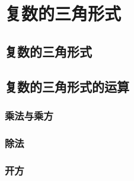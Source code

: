 \section{复数的三角形式}
\subsection{复数的三角形式}
\begin{Practice}
  \begin{question}
    \item 
    \item 
    \item 
  \end{question}
\end{Practice}

\subsection{复数的三角形式的运算}
\subsubsection{乘法与乘方}
\begin{Practice}
  \begin{question}
    \item 
    \item 
    \item 
  \end{question}
\end{Practice}
\subsubsection{除法}
\begin{Practice}
  \begin{question}
    \item 
    \item 
  \end{question}
\end{Practice}
\subsubsection{开方}
\begin{Practice}
  \begin{question}
    \item 
    \item 
    \item 
    \item 
  \end{question}
\end{Practice}

